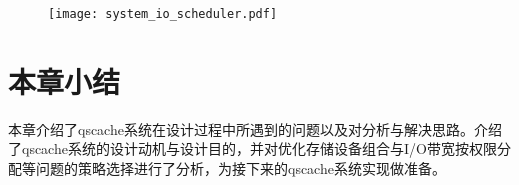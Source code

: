 \begin{figure}[!htbp]
    \centering
    \texttt{[image: system\_io\_scheduler.pdf]}
\end{figure}

\section{本章小结}

本章介绍了qscache系统在设计过程中所遇到的问题以及对分析与解决思路。介绍了qscache系统的设计动机与设计目的，并对优化存储设备组合与I/O带宽按权限分配等问题的策略选择进行了分析，为接下来的qscache系统实现做准备。